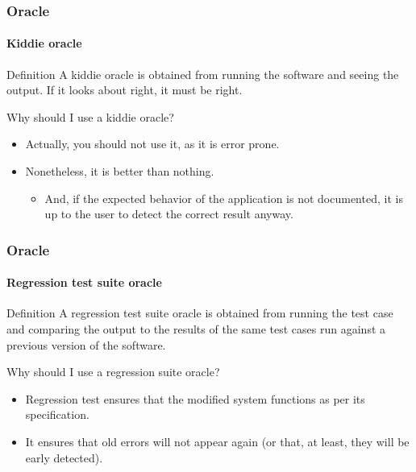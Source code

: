 \begin{frame}
\label{concept:kiddie-oracle}
\frametitle{Oracle}
\framesubtitle{Kiddie oracle}

\begin{block:concept}{Definition}
A kiddie oracle is obtained from running the software and seeing the output. If
it looks about right, it must be right.
\end{block:concept}

\begin{block:fact}{Why should I use a kiddie oracle?}
\begin{itemize}
	\item Actually, you should not use it, as it is error prone.

	\item Nonetheless, it is better than nothing.
	\begin{itemize}
		\item And, if the expected behavior of the application is not
		documented, it is up to the user to detect the correct result anyway.
	\end{itemize}
\end{itemize}
\end{block:fact}

\hfill
{}
\end{frame}



\begin{frame}
\label{concept:regression-test-suite-oracle}
\frametitle{Oracle}
\framesubtitle{Regression test suite oracle}

\begin{block:concept}{Definition}
A regression test suite oracle  is obtained from running the test case and
comparing the output to the results of the same test cases run against a
previous version of the software.
\end{block:concept}

\begin{block:fact}{Why should I use a regression suite oracle?}
\begin{itemize}
	\item Regression test ensures that the modified system functions as per
	its specification.

	\item It ensures that old errors will not appear again (or that, at least,
	they will be early detected).
\end{itemize}
\end{block:fact}

\hfill
{}
\end{frame}



